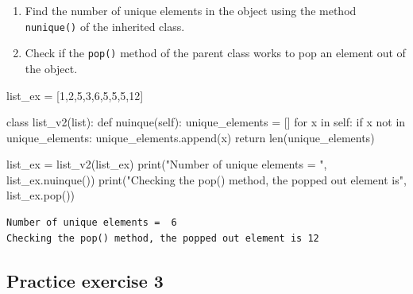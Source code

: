 \documentclass[
  letterpaper,
  DIV=11,
  numbers=noendperiod]{scrreprt}
\newenvironment{Shaded}{\begin{snugshade}}{\end{snugshade}}
\newcommand{\BuiltInTok}[1]{\textcolor[rgb]{0.00,0.23,0.31}{#1}}
\newcommand{\ControlFlowTok}[1]{\textcolor[rgb]{0.00,0.23,0.31}{#1}}
\newcommand{\DecValTok}[1]{\textcolor[rgb]{0.68,0.00,0.00}{#1}}
\newcommand{\KeywordTok}[1]{\textcolor[rgb]{0.00,0.23,0.31}{#1}}
\newcommand{\NormalTok}[1]{\textcolor[rgb]{0.00,0.23,0.31}{#1}}
\newcommand{\OperatorTok}[1]{\textcolor[rgb]{0.37,0.37,0.37}{#1}}
\newcommand{\StringTok}[1]{\textcolor[rgb]{0.13,0.47,0.30}{#1}}
\newcommand{\VariableTok}[1]{\textcolor[rgb]{0.07,0.07,0.07}{#1}}
\begin{document}
\begin{enumerate}
\def\labelenumi{\arabic{enumi}.}
\item
  Find the number of unique elements in the object using the method
  \texttt{nunique()} of the inherited class.
\item
  Check if the \texttt{pop()} method of the parent class works to pop an
  element out of the object.
\end{enumerate}

\begin{Shaded}
\begin{Highlighting}[]
\NormalTok{list\_ex }\OperatorTok{=}\NormalTok{ [}\DecValTok{1}\NormalTok{,}\DecValTok{2}\NormalTok{,}\DecValTok{5}\NormalTok{,}\DecValTok{3}\NormalTok{,}\DecValTok{6}\NormalTok{,}\DecValTok{5}\NormalTok{,}\DecValTok{5}\NormalTok{,}\DecValTok{5}\NormalTok{,}\DecValTok{12}\NormalTok{]}
\end{Highlighting}
\end{Shaded}

\begin{Shaded}
\begin{Highlighting}[]
\KeywordTok{class}\NormalTok{ list\_v2(}\BuiltInTok{list}\NormalTok{):}
    \KeywordTok{def}\NormalTok{ nuinque(}\VariableTok{self}\NormalTok{):}
\NormalTok{        unique\_elements }\OperatorTok{=}\NormalTok{ []}
        \ControlFlowTok{for}\NormalTok{ x }\KeywordTok{in} \VariableTok{self}\NormalTok{:}
            \ControlFlowTok{if}\NormalTok{ x }\KeywordTok{not} \KeywordTok{in}\NormalTok{ unique\_elements:}
\NormalTok{                unique\_elements.append(x)}
        \ControlFlowTok{return} \BuiltInTok{len}\NormalTok{(unique\_elements)}
    
\NormalTok{list\_ex }\OperatorTok{=}\NormalTok{ list\_v2(list\_ex)}
\BuiltInTok{print}\NormalTok{(}\StringTok{"Number of unique elements = "}\NormalTok{, list\_ex.nuinque())}
\BuiltInTok{print}\NormalTok{(}\StringTok{"Checking the pop() method, the popped out element is"}\NormalTok{, list\_ex.pop())}
\end{Highlighting}
\end{Shaded}

\begin{verbatim}
Number of unique elements =  6
Checking the pop() method, the popped out element is 12
\end{verbatim}

\hypertarget{practice-exercise-3-3}{%
\subsection{Practice exercise 3}\label{practice-exercise-3-3}}
\end{document}
